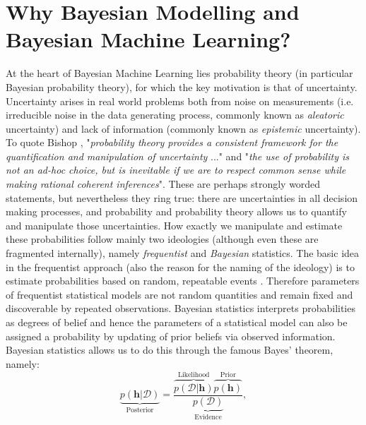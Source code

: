 \section{Why Bayesian Modelling and Bayesian Machine Learning?}
\label{sec:BayesianModelling}

At the heart of Bayesian Machine Learning lies probability theory (in particular Bayesian probability theory), for which the key motivation is that of uncertainty. Uncertainty arises in real world problems both from noise on measurements (i.e. irreducible noise in the data generating process, commonly known as \textit{aleatoric} uncertainty) and lack of information (commonly known as \textit{epistemic} uncertainty). To quote Bishop \citep{ChrisBishop_Patterns}, "\textit{probability theory provides a consistent framework for the quantification and manipulation of uncertainty }..." and "\textit{the use of probability is not an ad-hoc choice, but is inevitable if we are to respect common sense while making rational coherent inferences}". These are perhaps strongly worded statements, but nevertheless they ring true: there are uncertainties in all decision making processes, and probability and probability theory allows us to quantify and manipulate those uncertainties. How exactly we manipulate and estimate these probabilities follow mainly two ideologies (although even these are fragmented internally), namely \textit{frequentist} and \textit{Bayesian} statistics. The basic idea in the frequentist approach (also the reason for the naming of the ideology) is to estimate probabilities based on random, repeatable events \citep{ChrisBishop_Patterns}. Therefore parameters of frequentist statistical models are not random quantities and remain fixed and discoverable by repeated observations. Bayesian statistics interprets probabilities as degrees of belief and hence the parameters of a statistical model can also be assigned a probability by updating of prior beliefs via observed information. Bayesian statistics allows us to do this through the famous Bayes' theorem, namely: \\


\begin{equation}
    \underbrace{p(\mathbf{h}|\mathcal{D})}_{\text{Posterior}}=\frac{\overbrace{p(\mathcal{D}|\mathbf{h})}^{\text{Likelihood}}\overbrace{p(\mathbf{h})}^{\text{Prior}}}{\underbrace{p(\mathcal{D})}_{\text{Evidence}}},
\end{equation}

